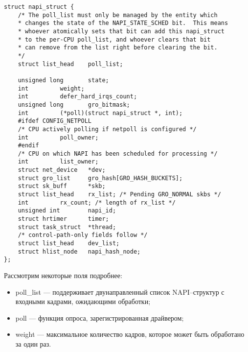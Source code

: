 \begin{center}
	\captionsetup{justification=raggedright,singlelinecheck=off}
	\begin{lstlisting}[label=lst:napi_struct,caption=Код структуры napi\_struct,showstringspaces=false]
struct napi_struct {
	/* The poll_list must only be managed by the entity which
	* changes the state of the NAPI_STATE_SCHED bit.  This means
	* whoever atomically sets that bit can add this napi_struct
	* to the per-CPU poll_list, and whoever clears that bit
	* can remove from the list right before clearing the bit.
	*/
	struct list_head	poll_list;
	
	unsigned long		state;
	int			weight;
	int			defer_hard_irqs_count;
	unsigned long		gro_bitmask;
	int			(*poll)(struct napi_struct *, int);
	#ifdef CONFIG_NETPOLL
	/* CPU actively polling if netpoll is configured */
	int			poll_owner;
	#endif
	/* CPU on which NAPI has been scheduled for processing */
	int			list_owner;
	struct net_device	*dev;
	struct gro_list		gro_hash[GRO_HASH_BUCKETS];
	struct sk_buff		*skb;
	struct list_head	rx_list; /* Pending GRO_NORMAL skbs */
	int			rx_count; /* length of rx_list */
	unsigned int		napi_id;
	struct hrtimer		timer;
	struct task_struct	*thread;
	/* control-path-only fields follow */
	struct list_head	dev_list;
	struct hlist_node	napi_hash_node;
};
	\end{lstlisting}
\end{center}
\FloatBarrier

Рассмотрим некоторые поля подробнее:
\begin{itemize}[label=---]
	\item poll\_list --- поддерживает двунаправленный список NAPI--структур с входными кадрами, ожидающими обработки;
	\item poll --- функция опроса, зарегистрированная драйвером; 
	\item weight --- максимальное количество кадров, которое может быть обработано за один раз.
\end{itemize}

